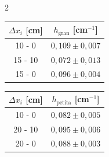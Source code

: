 \documentclass[12pt,twosides,onecolumn,openany]{article}
\newenvironment{Figura}
  {\par\medskip\noindent\minipage{\linewidth}}
  {\endminipage\par\medskip}
\begin{document}
\begin{multicols}{2}
\begin{Figura}
\begin{tabular}{c|c}
        $\Delta x_i$ [cm]  & $h_{\text{gran}}$ [cm$^{-1}$]\\ \hline\hline
        10 - 0 & $0,109\pm0,007$ \\
        15 - 10 & $0,072\pm0,013$ \\
        15 - 0 & $0,096\pm0,004$
      \end{tabular}
    \end{Figura}
    \begin{Figura}
      \centering
      \begin{tabular}{c|c}
        $\Delta x_i$ [cm]  & $h_{\text{petita}}$ [cm$^{-1}$]\\ \hline\hline
        10 - 0 & $0,082\pm0,005$ \\
        20 - 10 & $0,095\pm0,006$ \\
        20 - 0 & $0,088\pm0,003$
      \end{tabular}
    \end{Figura}
\end{multicols}
 

\end{document}
